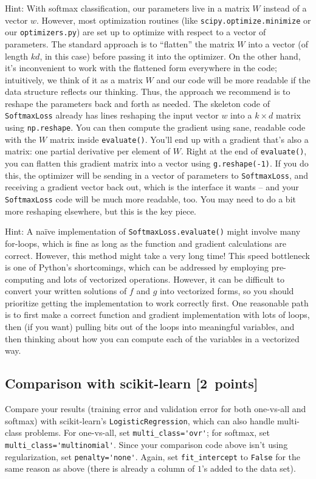\documentclass{article}
\newcommand{\blu}[1]{{\textcolor{blu}{#1}}}
\let\ask\blu
\newcommand\pts[1]{\textcolor{pointscolour}{[#1~points]}}
\begin{document}
Hint: With softmax classification, our parameters live in a matrix $W$ instead of a vector $w$. However, most optimization routines (like \verb|scipy.optimize.minimize| or our \verb|optimizers.py|) are set up to optimize with respect to a vector of parameters. The standard approach is to ``flatten'' the matrix $W$ into a vector (of length $kd$, in this case) before passing it into the optimizer. On the other hand, it's inconvenient to work with the flattened form everywhere in the code; intuitively, we think of it as a matrix $W$ and our code will be more readable if the data structure reflects our thinking. Thus, the approach we recommend is to reshape the parameters back and forth as needed. The skeleton code of \verb|SoftmaxLoss| already has lines reshaping the input vector $w$ into a $k \times d$ matrix using \verb|np.reshape|. You can then compute the gradient using sane, readable code with the $W$ matrix inside \verb|evaluate()|. You'll end up with a gradient that's also a matrix: one partial derivative per element of $W$. Right at the end of \verb|evaluate()|, you can flatten this gradient matrix into a vector using \verb|g.reshape(-1)|. If you do this, the optimizer will be sending in a vector of parameters to \verb|SoftmaxLoss|, and receiving a gradient vector back out, which is the interface it wants -- and your \verb|SoftmaxLoss| code will be much more readable, too. You may need to do a bit more reshaping elsewhere, but this is the key piece.

Hint: A na\"ive implementation of \verb|SoftmaxLoss.evaluate()| might involve many for-loops, which is fine as long as the function and gradient calculations are correct. However, this method might take a very long time! This speed bottleneck is one of Python's shortcomings, which can be addressed by employing pre-computing and lots of vectorized operations. However, it can be difficult to convert your written solutions of $f$ and $g$ into vectorized forms, so you should prioritize getting the implementation to work correctly first. One reasonable path is to first make a correct function and gradient implementation with lots of loops, then (if you want) pulling bits out of the loops into meaningful variables, and then thinking about how you can compute each of the variables in a vectorized way.


\subsection{Comparison with scikit-learn \pts{2}}
\ask{Compare your results (training error and validation error for both one-vs-all and softmax) with scikit-learn's \texttt{LogisticRegression}},
which can also handle multi-class problems.
For one-vs-all, set \verb|multi_class='ovr'|; for softmax, set \verb|multi_class='multinomial'|.
Since your comparison code above isn't using regularization, set \verb|penalty='none'|.
Again, set \verb|fit_intercept| to \verb|False| for the same reason as above (there is already a column of $1$'s added to the data set).
\end{document}
